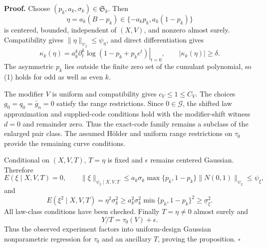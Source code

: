\textbf{Proof.}
Choose \((p_k,a_k,\sigma_k)\in\mathfrak S_k\). Then
\[
 \eta=a_k(B-p_k)\in\{-a_kp_k,a_k(1-p_k)\}
\]
is centered, bounded, independent of \((X,V)\), and nonzero almost surely. Compatibility gives \(\|\eta\|_{\psi_2}\le\psi_\eta\), and direct differentiation gives
\[
 \kappa_k(\eta)=a_k^k
 \left.\partial_t^k\log(1-p_k+p_ke^t)\right|_{t=0},
 \qquad |\kappa_k(\eta)|\ge\delta. \tag{1}
\]
The asymmetric \(p_k\) lies outside the finite zero set of the cumulant polynomial, so (1) holds for odd as well as even \(k\).

The modifier \(V\) is uniform and compatibility gives \(c_V\le1\le C_V\). The choices \(g_0=q_0=\bar g_n=0\) satisfy the range restrictions. Since \(0\in\mathcal G\), the shifted law approximation and supplied-code conditions hold with the modifier-shift witness \(d=0\) and remainder zero. Thus the exact-code family remains a subclass of the enlarged pair class. The assumed H\"older and uniform range restrictions on \(\tau_0\) provide the remaining curve conditions.

Conditional on \((X,V,T)\), \(T=\eta\) is fixed and \(\epsilon\) remains centered Gaussian. Therefore
\[
 E(\xi\mid X,V,T)=0,\qquad
 \|\xi\|_{\psi_2\mid X,V,T}
 \le a_k\sigma_k\max\{p_k,1-p_k\}\|N(0,1)\|_{\psi_2}
 \le\psi_\xi, \tag{2}
\]
and
\[
 E(\xi^2\mid X,V,T)
 =\eta^2\sigma_k^2
 \ge a_k^2\sigma_k^2\min\{p_k,1-p_k\}^2
 \ge\underline\sigma_\xi^2. \tag{3}
\]
All law-class conditions have been checked. Finally \(T=\eta\ne0\) almost surely and
\[
 Y/T=\tau_0(V)+\epsilon. \tag{4}
\]
Thus the observed experiment factors into uniform-design Gaussian nonparametric regression for \(\tau_0\) and an ancillary \(T\), proving the proposition. \(\square\)